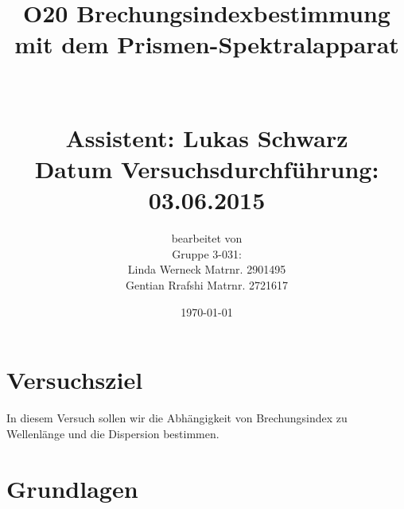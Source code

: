 \documentclass[fontsize=12pt]{scrartcl}
\begin{document}
\begin{minipage}{\textwidth}
\begin{center}\large
\title{ O20 Brechungsindexbestimmung mit dem Prismen-Spektralapparat \\
		~\\
		~\\
		Assistent: Lukas Schwarz \\
		Datum Versuchsdurchführung: \\
		03.06.2015}

\author{bearbeitet von\\
		Gruppe 3-031: \\
		Linda Werneck Matrnr. 2901495 \\
		Gentian Rrafshi Matrnr. 2721617 }
\date{\today}

\maketitle

\end{center}
\end{minipage}

\newpage

\tableofcontents

\newpage
\noindent

\section{ Versuchsziel}

In diesem Versuch sollen wir die Abhängigkeit von Brechungsindex zu Wellenlänge und die Dispersion bestimmen.

\section{ Grundlagen}
\end{document}
